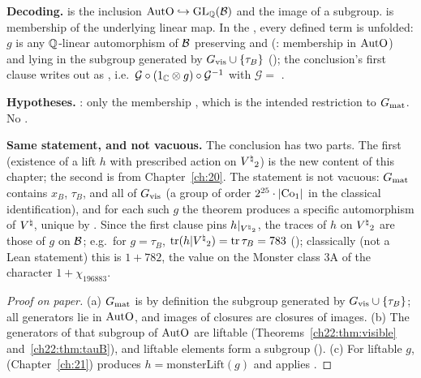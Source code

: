\begin{dictionary}
\textbf{Decoding.}   is the inclusion $\mathrm{AutO}\hookrightarrow\mathrm{GL}_{\mathbb{Q}}(\mathcal{B})$ and
 the image of a subgroup.   is membership of the underlying linear
map.  In the , every defined term is unfolded: $g$ is any ${\mathbb{Q}}$-linear automorphism of $\mathcal{B}$
preserving  and  (: membership in $\mathrm{AutO}$) and lying in the subgroup generated by
$G_{\mathrm{vis}}\cup\{\tau_B\}$ (); the conclusion's first clause writes  out as
, i.e.\ $\mathcal G\circ(1_{\mathbb{C}}\otimes
g)\circ\mathcal G^{-1}$ with $\mathcal G=$ .

\textbf{Hypotheses.}  : only the membership , which is the intended restriction to
$G_{\mathrm{mat}}$.  No .

\textbf{Same statement, and not vacuous.}  The conclusion has two parts.  The first (existence of a lift $h$ with prescribed
action on ${V^{\natural}}_2$) is the new content of this chapter; the second is  from Chapter~\ref{ch:20}.  The
statement is not vacuous: $G_{\mathrm{mat}}$ contains $x_B$, $\tau_B$, and all of $G_{\mathrm{vis}}$ (a group of order
$2^{25}\cdot|\mathrm{Co}_1|$ in the classical identification), and for each such $g$ the theorem produces a specific
automorphism of ${V^{\natural}}$, unique by .  Since the first clause pins $h|_{{V^{\natural}}_2}$, the
traces of $h$ on ${V^{\natural}}_2$ are those of $g$ on $\mathcal{B}$; e.g.\ for $g=\tau_B$, $\operatorname{tr}(h|{V^{\natural}}_2)=\operatorname{tr}\tau_B=783$
(); classically (not a Lean statement) this is $1+782$, the value on the Monster class 3A of the
character $1+\chi_{196883}$.
\end{dictionary}
\begin{proof}[Proof on paper]
(a) $G_{\mathrm{mat}}$ is by definition the subgroup generated by $G_{\mathrm{vis}}\cup\{\tau_B\}$; all generators lie in
$\mathrm{AutO}$, and images of closures are closures of images.  (b) The generators of that subgroup of
$\mathrm{AutO}$ are liftable (Theorems~\ref{ch22:thm:visible} and~\ref{ch22:thm:tauB}), and liftable elements form a
subgroup ().  (c) For liftable $g$, 
(Chapter~\ref{ch:21}) produces $h=\mathrm{monsterLift}(g)$ and applies .
\end{proof}
